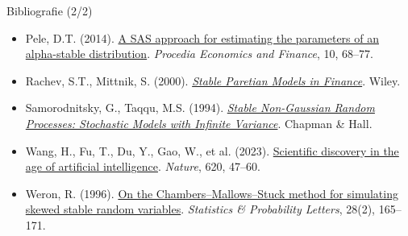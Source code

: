 \begin{frame}{Bibliografie (2/2)}
\begin{itemize}
    \item Pele, D.T. (2014). \href{https://doi.org/10.1016/S2212-5671(14)00279-2}{A SAS approach for estimating the parameters of an alpha-stable distribution}. \textit{Procedia Economics and Finance}, 10, 68--77.
    \item Rachev, S.T., Mittnik, S. (2000). \href{https://www.wiley.com/en-us/Stable+Paretian+Models+in+Finance-p-9780471953142}{\textit{Stable Paretian Models in Finance}}. Wiley.
    \item Samorodnitsky, G., Taqqu, M.S. (1994). \href{https://doi.org/10.1201/9780203738818}{\textit{Stable Non-Gaussian Random Processes: Stochastic Models with Infinite Variance}}. Chapman \& Hall.
    \item Wang, H., Fu, T., Du, Y., Gao, W., et al. (2023). \href{https://doi.org/10.1038/s41586-023-06221-2}{Scientific discovery in the age of artificial intelligence}. \textit{Nature}, 620, 47--60.
    \item Weron, R. (1996). \href{https://doi.org/10.1016/0167-7152(95)00113-1}{On the Chambers--Mallows--Stuck method for simulating skewed stable random variables}. \textit{Statistics \& Probability Letters}, 28(2), 165--171.
\end{itemize}
\end{frame}


